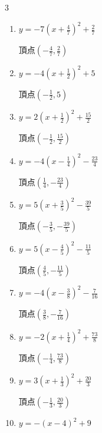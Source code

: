\begin{multicols}{3}
\begin{enumerate}
        $\displaystyle 頂点\left( -\frac{2}{3} , -\frac{14}{3} \right)$

  \item $\displaystyle y=-7\left( x+\frac{4}{7}\right)^{2}+\frac{2}{7}$

        $\displaystyle 頂点\left( -\frac{4}{7} , \frac{2}{7} \right)$

  \item $\displaystyle y=-4\left( x+\frac{1}{2}\right)^{2}+5$

        $\displaystyle 頂点\left( -\frac{1}{2} , 5 \right)$

  \item $\displaystyle y=2\left( x+\frac{1}{2}\right)^{2}+\frac{15}{2}$

        $\displaystyle 頂点\left( -\frac{1}{2} , \frac{15}{2} \right)$

\columnbreak %

  \item $\displaystyle y=-4\left( x-\frac{1}{4}\right)^{2}-\frac{23}{4}$

        $\displaystyle 頂点\left( \frac{1}{4} , -\frac{23}{4} \right)$

  \item $\displaystyle y=5\left( x+\frac{3}{5}\right)^{2}-\frac{39}{5}$

        $\displaystyle 頂点\left( -\frac{3}{5} , -\frac{39}{5} \right)$

  \item $\displaystyle y=5\left( x-\frac{4}{5}\right)^{2}-\frac{11}{5}$

        $\displaystyle 頂点\left( \frac{4}{5} , -\frac{11}{5} \right)$

  \item $\displaystyle y=-4\left( x-\frac{3}{8}\right)^{2}-\frac{7}{16}$

        $\displaystyle 頂点\left( \frac{3}{8} , -\frac{7}{16} \right)$

  \item $\displaystyle y=-2\left( x+\frac{1}{4}\right)^{2}+\frac{73}{8}$

        $\displaystyle 頂点\left( -\frac{1}{4} , \frac{73}{8} \right)$

  \item $\displaystyle y=3\left( x+\frac{1}{3}\right)^{2}+\frac{20}{3}$

        $\displaystyle 頂点\left( -\frac{1}{3} , \frac{20}{3} \right)$

  \item $\displaystyle y=-\left( x-4\right)^{2}+9$


\end{enumerate}
\end{multicols}
